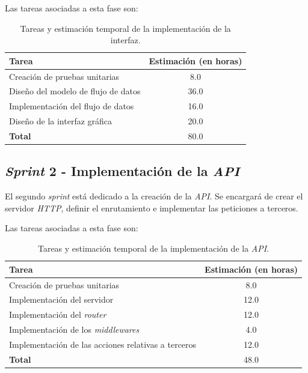 Las tareas asociadas a esta fase son:\sn

\begin{table}[ht]
    \begin{center}
        \begin{tabular}{| l | c |}
            \hline
            \textbf{Tarea} & \textbf{Estimación} (en horas) \\
            \hline
            Creación de pruebas unitarias       & 8.0 \\ \hline
            Diseño del modelo de flujo de datos & 36.0 \\ \hline
            Implementación del flujo de datos   & 16.0 \\ \hline
            Diseño de la interfaz gráfica       & 20.0 \\ \hline
            \textbf{Total}                      & 80.0 \\ \hline
        \end{tabular}
    \end{center}
    \caption{Tareas y estimación temporal de la implementación de la interfaz.}
    \label{tab:phase4}
\end{table}

\subsection{\textit{Sprint} 2 - Implementación de la \textit{API}} \label{sub:sprint2}

El segundo \textit{sprint} está dedicado a la creación de la \textit{API}. Se encargará de crear el servidor \textit{HTTP}, definir el enrutamiento e implementar las peticiones a terceros.\sn

Las tareas asociadas a esta fase son:\sn

\begin{table}[ht]
    \begin{center}
        \begin{tabular}{| l | c |}
            \hline
            \textbf{Tarea} & \textbf{Estimación} (en horas) \\
            \hline
            Creación de pruebas unitarias       & 8.0 \\ \hline
            Implementación del servidor         & 12.0 \\ \hline
            Implementación del \textit{router}  & 12.0 \\ \hline
            Implementación de los \textit{middlewares} & 4.0 \\ \hline
            Implementación de las acciones relativas a terceros & 12.0 \\ \hline
            \textbf{Total}                          & 48.0 \\ \hline
        \end{tabular}
    \end{center}
    \caption{Tareas y estimación temporal de la implementación de la \textit{API}.}
    \label{tab:phase5}
\end{table}

